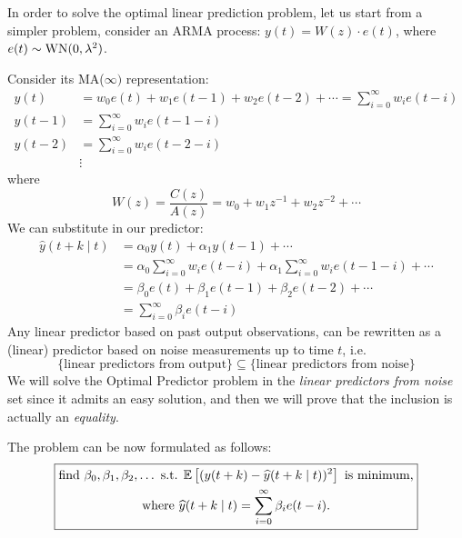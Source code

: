 
In order to solve the optimal linear prediction problem, let us start from a simpler problem, consider an ARMA process: $y(t)=W(z) \cdot e(t)$, where $e(t) \sim \operatorname{WN}(0, \lambda^{2})$.

Consider its MA($\infty)$ representation:
\begin{align*}
	y(t)&=w_{0} e(t)+w_{1} e(t-1)+w_{2} e(t-2)+\cdots=\sum_{i=0}^{\infty} w_{i} e(t-i)\\
	y(t-1)&=\sum_{i=0}^{\infty} w_{i} e(t-1-i)\\
	y(t-2)&=\sum_{i=0}^{\infty} w_{i} e(t-2-i)\\
	&\vdots
\end{align*}
where
\[
	W(z)=\frac{C(z)}{A(z)}=w_{0}+w_{1} z^{-1}+w_{2} z^{-2}+\cdots
\]
We can substitute in our predictor:
\begin{align*}
	\hat{y}(t+k \mid t) &=\alpha_{0} y(t)+\alpha_{1} y(t-1)+\cdots \\
	&=\alpha_{0} \sum_{i=0}^{\infty} w_{i} e(t-i)+\alpha_{1} \sum_{i=0}^{\infty} w_{i} e(t-1-i)+\cdots \\
	&=\beta_{0} e(t)+\beta_{1} e(t-1)+\beta_{2} e(t-2)+\cdots\\
	&=\sum_{i=0}^{\infty} \beta_{i} e(t-i)
\end{align*}
Any linear predictor based on past output observations, can be rewritten as a (linear) predictor based on noise measurements up to time $t$, i.e.
\[
	\{\text{linear predictors from output}\} \subseteq \{\text{linear predictors from noise}\}
\]
We will solve the Optimal Predictor problem in the \emph{linear predictors from noise} set since it admits an easy solution, and then we will prove that the inclusion is actually an \emph{equality}.

The problem can be now formulated as follows:
\[
\boxed{
	\begin{gathered}
		\text{find } \beta_{0}, \beta_{1}, \beta_{2}, \ldots \text{ s.t. } \mathbb{E}\left[(y(t+k)-\widehat{y}(t+k \mid t))^{2}\right] \text{ is minimum,}\\
		\text{where } \widehat{y}(t+k \mid t) = \sum_{i=0}^{\infty} \beta_{i} e(t-i).
	\end{gathered}
	}
\]

